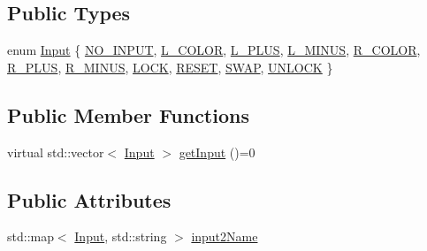 \subsection*{Public Types}
\begin{DoxyCompactItemize}
\item 
enum \hyperlink{class_input_device_a75152d8f06b6d032036014e42e44688b}{Input} \{ \newline
\hyperlink{class_input_device_a75152d8f06b6d032036014e42e44688ba2f18b34092c7ee0bb0a8905d1eb0a932}{N\+O\+\_\+\+I\+N\+P\+UT}, 
\hyperlink{class_input_device_a75152d8f06b6d032036014e42e44688ba62e8e3a8805c10a1aeafdf32508a363d}{L\+\_\+\+C\+O\+L\+OR}, 
\hyperlink{class_input_device_a75152d8f06b6d032036014e42e44688ba2dfac8e357208426c5557646fc4851bc}{L\+\_\+\+P\+L\+US}, 
\hyperlink{class_input_device_a75152d8f06b6d032036014e42e44688ba0a6c0f0f21ce6b32c7f9bf45c268ed7d}{L\+\_\+\+M\+I\+N\+US}, 
\newline
\hyperlink{class_input_device_a75152d8f06b6d032036014e42e44688ba55ff3df43eb079f61c3de4c26e891484}{R\+\_\+\+C\+O\+L\+OR}, 
\hyperlink{class_input_device_a75152d8f06b6d032036014e42e44688ba01c5d472c59979ad6c0ed0515e4f0b76}{R\+\_\+\+P\+L\+US}, 
\hyperlink{class_input_device_a75152d8f06b6d032036014e42e44688bafaf17bc1c44227054bb36ff122009380}{R\+\_\+\+M\+I\+N\+US}, 
\hyperlink{class_input_device_a75152d8f06b6d032036014e42e44688ba6505274aefdffec5baf47c150aa2d87a}{L\+O\+CK}, 
\newline
\hyperlink{class_input_device_a75152d8f06b6d032036014e42e44688ba906dded9cca7bddf13e5b394c4aa66ed}{R\+E\+S\+ET}, 
\hyperlink{class_input_device_a75152d8f06b6d032036014e42e44688ba4ff7ca0942a282a8006d53cd81ee4ba4}{S\+W\+AP}, 
\hyperlink{class_input_device_a75152d8f06b6d032036014e42e44688badfdd07b1c95cf33f16d73314282ee81d}{U\+N\+L\+O\+CK}
 \}
\end{DoxyCompactItemize}
\subsection*{Public Member Functions}
\begin{DoxyCompactItemize}
\item 
virtual std\+::vector$<$ \hyperlink{class_input_device_a75152d8f06b6d032036014e42e44688b}{Input} $>$ \hyperlink{class_input_device_a946ae438b3a044741614493000aa216f}{get\+Input} ()=0
\end{DoxyCompactItemize}
\subsection*{Public Attributes}
\begin{DoxyCompactItemize}
\item 
std\+::map$<$ \hyperlink{class_input_device_a75152d8f06b6d032036014e42e44688b}{Input}, std\+::string $>$ \hyperlink{class_input_device_a00a8bfc566bbed9a7bae53cacdf82715}{input2\+Name}
\end{DoxyCompactItemize}


